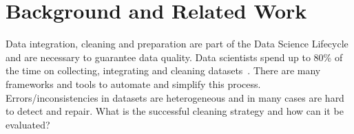 \chapter{Background and Related Work}
Data integration, cleaning and preparation are part of the Data Science Lifecycle and are necessary to guarantee data quality. 
Data scientists spend up to 80\% of the time on collecting, integrating and cleaning datasets~\cite{80cleansurvey}. There are many frameworks and tools to automate and simplify this process. 
\\
Errors/inconsistencies in datasets are heterogeneous and in many cases are hard to detect and repair. What is the successful cleaning strategy and how can it be evaluated? 





